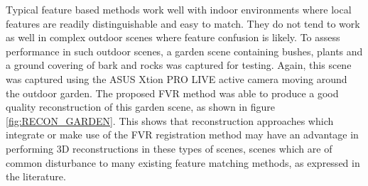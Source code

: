Typical feature based methods work well with indoor environments where local features are readily distinguishable and easy to match. They do not tend to work as well in complex outdoor scenes where feature confusion is likely. To assess performance in such outdoor scenes, a garden scene containing bushes, plants and a ground covering of bark and rocks was captured for testing. Again, this scene was captured using the ASUS Xtion PRO LIVE active camera moving around the outdoor garden. The proposed FVR method was able to produce a good quality reconstruction of this garden scene, as shown in figure \ref{fig:RECON_GARDEN}. This shows that reconstruction approaches which integrate or make use of the FVR registration method may have an advantage in performing 3D reconstructions in these types of scenes, scenes which are of common disturbance to many existing feature matching methods, as expressed in the literature.   
